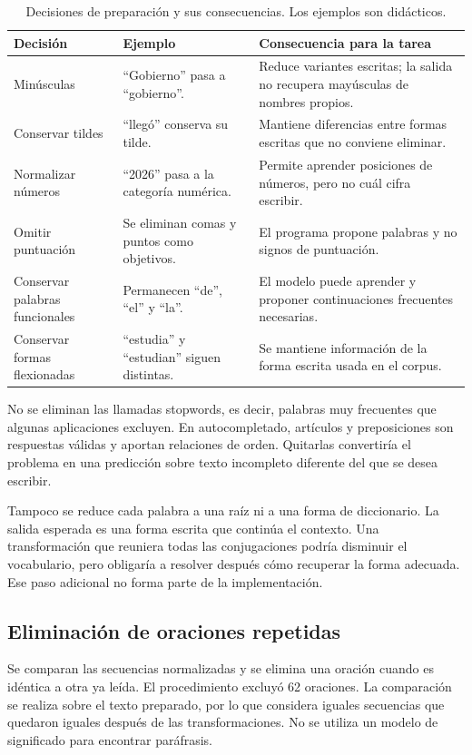 \begin{table}[tb]
\caption{Decisiones de preparación y sus consecuencias. Los ejemplos son didácticos.}
\centering
\begin{tabular}{p{}p{}p{}}
\toprule Decisión & Ejemplo & Consecuencia para la tarea\\\midrule
Minúsculas & ``Gobierno'' pasa a ``gobierno''. & Reduce variantes escritas; la salida no recupera mayúsculas de nombres propios.\\
Conservar tildes & ``llegó'' conserva su tilde. & Mantiene diferencias entre formas escritas que no conviene eliminar.\\
Normalizar números & ``2026'' pasa a la categoría numérica. & Permite aprender posiciones de números, pero no cuál cifra escribir.\\
Omitir puntuación & Se eliminan comas y puntos como objetivos. & El programa propone palabras y no signos de puntuación.\\
Conservar palabras funcionales & Permanecen ``de'', ``el'' y ``la''. & El modelo puede aprender y proponer continuaciones frecuentes necesarias.\\
Conservar formas flexionadas & ``estudia'' y ``estudian'' siguen distintas. & Se mantiene información de la forma escrita usada en el corpus.\\\bottomrule
\end{tabular}
\end{table}

No se eliminan las llamadas stopwords, es decir, palabras muy frecuentes que algunas aplicaciones excluyen. En autocompletado, artículos y preposiciones son respuestas válidas y aportan relaciones de orden. Quitarlas convertiría el problema en una predicción sobre texto incompleto diferente del que se desea escribir.

Tampoco se reduce cada palabra a una raíz ni a una forma de diccionario. La salida esperada es una forma escrita que continúa el contexto. Una transformación que reuniera todas las conjugaciones podría disminuir el vocabulario, pero obligaría a resolver después cómo recuperar la forma adecuada. Ese paso adicional no forma parte de la implementación.

\subsection{Eliminación de oraciones repetidas}
Se comparan las secuencias normalizadas y se elimina una oración cuando es idéntica a otra ya leída. El procedimiento excluyó 62 oraciones. La comparación se realiza sobre el texto preparado, por lo que considera iguales secuencias que quedaron iguales después de las transformaciones. No se utiliza un modelo de significado para encontrar paráfrasis.

